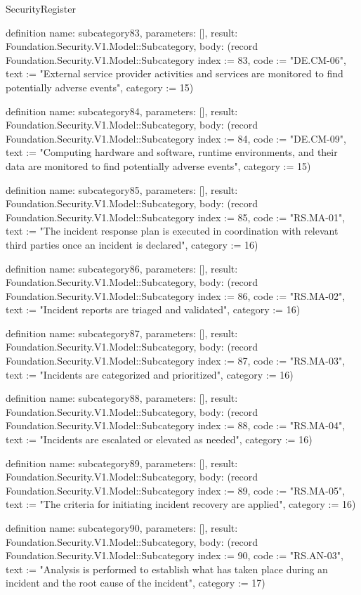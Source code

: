 \begin{lexlean}{SecurityRegister}
\begin{semanticmodule}
definition{
  name: subcategory83,
  parameters: [],
  result: Foundation.Security.V1.Model::Subcategory,
  body: (record Foundation.Security.V1.Model::Subcategory {index := 83, code := "DE.CM-06", text := "External service provider activities and services are monitored to find potentially adverse events", category := 15})
}

definition{
  name: subcategory84,
  parameters: [],
  result: Foundation.Security.V1.Model::Subcategory,
  body: (record Foundation.Security.V1.Model::Subcategory {index := 84, code := "DE.CM-09", text := "Computing hardware and software, runtime environments, and their data are monitored to find potentially adverse events", category := 15})
}

definition{
  name: subcategory85,
  parameters: [],
  result: Foundation.Security.V1.Model::Subcategory,
  body: (record Foundation.Security.V1.Model::Subcategory {index := 85, code := "RS.MA-01", text := "The incident response plan is executed in coordination with relevant third parties once an incident is declared", category := 16})
}

definition{
  name: subcategory86,
  parameters: [],
  result: Foundation.Security.V1.Model::Subcategory,
  body: (record Foundation.Security.V1.Model::Subcategory {index := 86, code := "RS.MA-02", text := "Incident reports are triaged and validated", category := 16})
}

definition{
  name: subcategory87,
  parameters: [],
  result: Foundation.Security.V1.Model::Subcategory,
  body: (record Foundation.Security.V1.Model::Subcategory {index := 87, code := "RS.MA-03", text := "Incidents are categorized and prioritized", category := 16})
}

definition{
  name: subcategory88,
  parameters: [],
  result: Foundation.Security.V1.Model::Subcategory,
  body: (record Foundation.Security.V1.Model::Subcategory {index := 88, code := "RS.MA-04", text := "Incidents are escalated or elevated as needed", category := 16})
}

definition{
  name: subcategory89,
  parameters: [],
  result: Foundation.Security.V1.Model::Subcategory,
  body: (record Foundation.Security.V1.Model::Subcategory {index := 89, code := "RS.MA-05", text := "The criteria for initiating incident recovery are applied", category := 16})
}

definition{
  name: subcategory90,
  parameters: [],
  result: Foundation.Security.V1.Model::Subcategory,
  body: (record Foundation.Security.V1.Model::Subcategory {index := 90, code := "RS.AN-03", text := "Analysis is performed to establish what has taken place during an incident and the root cause of the incident", category := 17})
}


\end{semanticmodule}
\end{lexlean}
